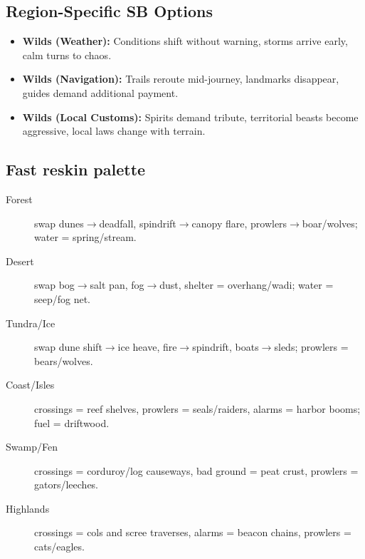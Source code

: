 \subsection*{Region-Specific SB Options}
\begin{itemize}
\item \textbf{Wilds (Weather):} Conditions shift without warning, storms arrive early, calm turns to chaos.
\item \textbf{Wilds (Navigation):} Trails reroute mid-journey, landmarks disappear, guides demand additional payment.
\item \textbf{Wilds (Local Customs):} Spirits demand tribute, territorial beasts become aggressive, local laws change with terrain.
\end{itemize}

\subsection*{Fast reskin palette}
\label{sec:wilderness-reskin-palette}
\begin{description}
\item[Forest] swap dunes$\rightarrow$deadfall, spindrift$\rightarrow$canopy flare, prowlers$\rightarrow$boar/wolves; water = spring/stream.
\item[Desert] swap bog$\rightarrow$salt pan, fog$\rightarrow$dust, shelter = overhang/wadi; water = seep/fog net.
\item[Tundra/Ice] swap dune shift$\rightarrow$ice heave, fire$\rightarrow$spindrift, boats$\rightarrow$sleds; prowlers = bears/wolves.
\item[Coast/Isles] crossings = reef shelves, prowlers = seals/raiders, alarms = harbor booms; fuel = driftwood.
\item[Swamp/Fen] crossings = corduroy/log causeways, bad ground = peat crust, prowlers = gators/leeches.
\item[Highlands] crossings = cols and scree traverses, alarms = beacon chains, prowlers = cats/eagles.
\end{description}
